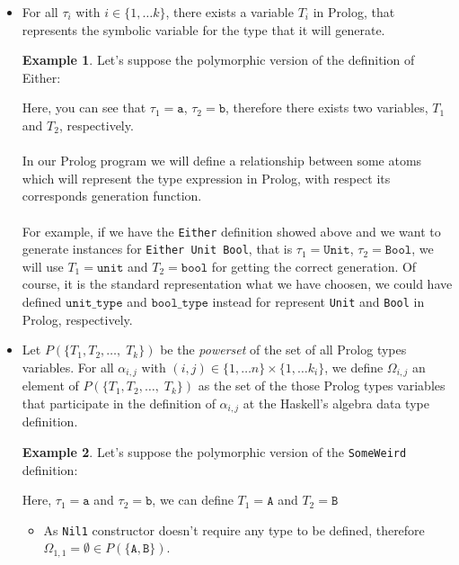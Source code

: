 \documentclass{report}
\theoremstyle{definition}
\newtheorem{example}{Example}[section]
\theoremstyle{definition}
\newcommand{\ttt}[1]{\texttt{#1}}
\begin{document}
\begin{itemize}
	\item For all $\tau_i$ with $i \in \{1, \ldots k \}$, there exists a variable $T_i$ in Prolog, that represents the symbolic variable for the type that it will generate.
	\begin{example}
		Let's suppose the polymorphic version of the definition of Either:
		
		Here, you can see that $\tau_1 = \ttt{a}$, $\tau_2 = \ttt{b}$, therefore there exists two variables, $T_1$ and $T_2$, respectively.\\\\
		In our Prolog program we will define a relationship between some atoms which will represent the type expression in Prolog, with respect its corresponds generation function.\\\\
		For example, if we have the \ttt{Either} definition showed above and we want to generate instances for \ttt{Either Unit Bool}, that is $\tau_1 = \ttt{Unit}$, $\tau_2 = \ttt{Bool}$, we will use $T_1 = \ttt{unit}$ and $T_2 = \ttt{bool}$ for getting the correct generation. Of course, it is the standard representation what we have choosen, we could have defined $\ttt{unit\_type}$ and $\ttt{bool\_type}$ instead for represent \ttt{Unit} and \ttt{Bool} in Prolog, respectively.
	\end{example}
	\item Let $P(\{ T_1 , T_2, \ldots, \; T_k \})$ be the \textit{powerset} of the set of all Prolog types variables. For all $\alpha_{i,j}$ with $(i,j) \in \{1, \ldots n \} \times \{1, \ldots k_i \}$, we define $\Omega_{i,j}$ an element of $P(\{ T_1 , T_2, \ldots, \; T_k \})$ as the set of the those Prolog types variables that participate in the definition of $\alpha_{i,j}$ at the Haskell's algebra data type definition.
	\begin{example}
		Let's suppose the polymorphic version of the \ttt{SomeWeird} definition:
		
		Here, $\tau_1 = \ttt{a}$ and $\tau_2=\ttt{b}$, we can define $T_1 = \ttt{A}$ and $T_2=\ttt{B}$
		\begin{itemize}
			\item As \ttt{Nil1} constructor doesn't require any type to be defined, therefore $\Omega_{1,1} = \emptyset \in P(\{ \ttt{A} , \ttt{B} \})$.

\end{itemize}
\end{example}
\end{itemize}
\end{document}
